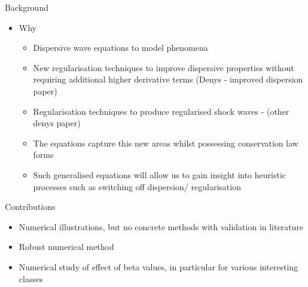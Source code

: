 \documentclass[10pt]{elsarticle}
\begin{document}
Background
\begin{itemize}
	\item Why 
	\begin{itemize}
		\item Dispersive wave equations to model phenomena
		\item New regularisation techniques to improve dispersive properties without requiring additional higher derivative terms (Denys - improved dispersion paper)
		\item Regularisation techniques to produce regularised shock waves - (other denys paper)
		\item The equations capture this new areas whilst possessing conservation law forms
		\item Such generalised equations will allow us to gain insight into heuristic processes such as switching off dispersion/ regularisation
	\end{itemize}
\end{itemize}

Contributions
\begin{itemize}
	\item Numerical illustrations, but no concrete methods with validation in literature
	\item Robust numerical method
	\item Numerical study of effect of beta values, in particular for various interesting classes
\end{itemize}



\end{document}
